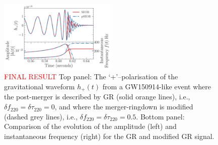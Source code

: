 \documentclass[twocolumn,prd,aps,superscriptaddress,preprintnumbers,tightenlines,showpacs,nofootinbib,eqsecnum,amsfonts,amsmath]{revtex4-1}
\newcommand{\df}[1]{\delta f_{\text{#1}}}
\newcommand{\dtau}[1]{\delta \tau_{\text{#1}}}
\begin{document}
\begin{figure}
	\includegraphics[width=0.5\textwidth]{figures/modGR_waveforms_amplitudephase.png}
	\caption{\textcolor{red}{FINAL RESULT} Top panel: The `+'--polarisation of the gravitational waveform $h_+(t)$ from a GW150914-like event where the post-merger is described by GR (solid orange lines), i.e., $\df{220} = \dtau{220} = 0$, and where the merger-ringdown is modified (dashed grey lines), i.e., $\df{220} = \dtau{220} = 0.5$. Bottom panel: Comparison of the evolution of the amplitude (left) and instantaneous frequency (right) for the GR and modified GR signal.}
	\label{fig:nongr_waveform}
\end{figure}
\end{document}
